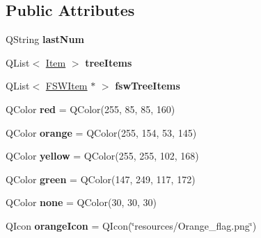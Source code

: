\subsection*{Public Attributes}
\begin{DoxyCompactItemize}
\item 
Q\+String {\bfseries last\+Num}\hypertarget{class_b_c___bulletin_a02b94a8421b4d9d5a0fa67ad4163c589}{}\label{class_b_c___bulletin_a02b94a8421b4d9d5a0fa67ad4163c589}

\item 
Q\+List$<$ \hyperlink{class_item}{Item} $>$ {\bfseries tree\+Items}\hypertarget{class_b_c___bulletin_a684dee5e9518c21f74f517fab9044eb3}{}\label{class_b_c___bulletin_a684dee5e9518c21f74f517fab9044eb3}

\item 
Q\+List$<$ \hyperlink{class_f_s_w_item}{F\+S\+W\+Item} $\ast$ $>$ {\bfseries fsw\+Tree\+Items}\hypertarget{class_b_c___bulletin_a635d32b92a3e61555613119c3282478e}{}\label{class_b_c___bulletin_a635d32b92a3e61555613119c3282478e}

\item 
Q\+Color {\bfseries red} = Q\+Color(255, 85, 85, 160)\hypertarget{class_b_c___bulletin_a3ac5f0b6fda0e8f5fd16b12563c4dfd8}{}\label{class_b_c___bulletin_a3ac5f0b6fda0e8f5fd16b12563c4dfd8}

\item 
Q\+Color {\bfseries orange} = Q\+Color(255, 154, 53, 145)\hypertarget{class_b_c___bulletin_a89ea24b766d8fb3b160756156b78d3d3}{}\label{class_b_c___bulletin_a89ea24b766d8fb3b160756156b78d3d3}

\item 
Q\+Color {\bfseries yellow} = Q\+Color(255, 255, 102, 168)\hypertarget{class_b_c___bulletin_ac2e374bfa775b0960b403144636260a6}{}\label{class_b_c___bulletin_ac2e374bfa775b0960b403144636260a6}

\item 
Q\+Color {\bfseries green} = Q\+Color(147, 249, 117, 172)\hypertarget{class_b_c___bulletin_aa24b2f1f4ace00a4664ffcf9274af9ab}{}\label{class_b_c___bulletin_aa24b2f1f4ace00a4664ffcf9274af9ab}

\item 
Q\+Color {\bfseries none} = Q\+Color(30, 30, 30)\hypertarget{class_b_c___bulletin_a2ad63bcad5c1c51fe6c9186637e4bbec}{}\label{class_b_c___bulletin_a2ad63bcad5c1c51fe6c9186637e4bbec}

\item 
Q\+Icon {\bfseries orange\+Icon} = Q\+Icon(\char`\"{}resources/Orange\+\_\+flag.\+png\char`\"{})\hypertarget{class_b_c___bulletin_a4762315504f8ab4ad914104389af0bf2}{}\label{class_b_c___bulletin_a4762315504f8ab4ad914104389af0bf2}


\end{DoxyCompactItemize}
